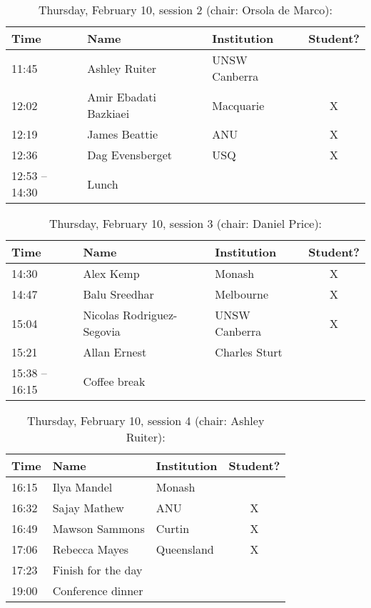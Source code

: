 \documentclass[amsmath,onecolumn]{revtex4-1}
\begin{document}
\begin{table}[!htbp]
	\centering
	\caption{Thursday, February 10, session 2 (chair: Orsola de Marco):}
\begin{tabular}{| l | l | l | c |}
	\hline
	Time & Name  & Institution & Student? \\ 		
	\hline
	11:45 &{Ashley Ruiter} & UNSW Canberra &  \\
	12:02 & {Amir Ebadati Bazkiaei} & Macquarie &  X \\
	12:19 & {James Beattie} & ANU & X \\
	12:36 &  {Dag Evensberget} & USQ & X\\
	12:53 -- 14:30 & Lunch & & \\
	\hline
\end{tabular}
\end{table}	


\begin{table}[!htbp]
	\centering
	\caption{Thursday, February 10, session 3 (chair: Daniel Price):}
\begin{tabular}{| l | l | l | c |}
	\hline
	Time & Name  & Institution & Student? \\ 		
	\hline
	14:30 & {Alex Kemp} & Monash & X  \\
	14:47 & {Balu Sreedhar} & Melbourne & X \\
	15:04 & {Nicolas Rodriguez-Segovia} & UNSW Canberra & X\\
	15:21 & {Allan Ernest} &  Charles Sturt&  \\
	15:38 -- 16:15 & Coffee break & & \\
	\hline
\end{tabular}
\end{table}

\begin{table}[!htbp]
	\centering
	\caption{Thursday, February 10, session 4 (chair: Ashley Ruiter):}
\begin{tabular}{| l | l | l | c |}
	\hline
	Time & Name  & Institution & Student? \\ 		
	\hline
	16:15 & {Ilya Mandel} & Monash &  \\
	16:32 & {Sajay Mathew} & ANU & X \\
	16:49 & {Mawson Sammons} & Curtin & X \\
	17:06 & {Rebecca Mayes} & Queensland & X \\
	17:23 & Finish for the day & & \\
	19:00 & Conference dinner & & \\
	\hline
\end{tabular}
\end{table}
\end{document}
